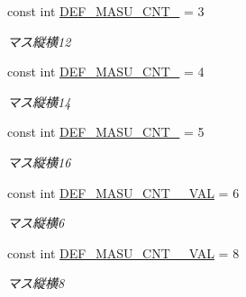 \begin{DoxyCompactItemize}
const int \hyperlink{class_reversi_form_1_1_reversi_const_aeb3bc389d85d1018293b65d93b585c87}{D\+E\+F\+\_\+\+M\+A\+S\+U\+\_\+\+C\+N\+T\+\_} = 3
\begin{DoxyCompactList}\small\item\em マス縦横12 \end{DoxyCompactList}\item 
\mbox{\label{class_reversi_form_1_1_reversi_const_abcbffb3e5165e8aab750b6b27ba08f86}} 
const int \hyperlink{class_reversi_form_1_1_reversi_const_abcbffb3e5165e8aab750b6b27ba08f86}{D\+E\+F\+\_\+\+M\+A\+S\+U\+\_\+\+C\+N\+T\+\_} = 4
\begin{DoxyCompactList}\small\item\em マス縦横14 \end{DoxyCompactList}\item 
\mbox{\label{class_reversi_form_1_1_reversi_const_a6e546a464ee9e35eb3ead02c41e9bd1f}} 
const int \hyperlink{class_reversi_form_1_1_reversi_const_a6e546a464ee9e35eb3ead02c41e9bd1f}{D\+E\+F\+\_\+\+M\+A\+S\+U\+\_\+\+C\+N\+T\+\_} = 5
\begin{DoxyCompactList}\small\item\em マス縦横16 \end{DoxyCompactList}\item 
\mbox{\label{class_reversi_form_1_1_reversi_const_a277a6661b72c88141678b1d2ac12948c}} 
const int \hyperlink{class_reversi_form_1_1_reversi_const_a277a6661b72c88141678b1d2ac12948c}{D\+E\+F\+\_\+\+M\+A\+S\+U\+\_\+\+C\+N\+T\+\_\+\_\+\+V\+AL} = 6
\begin{DoxyCompactList}\small\item\em マス縦横6 \end{DoxyCompactList}\item 
\mbox{\label{class_reversi_form_1_1_reversi_const_a9c1eff92f5330aeca5790ead2b3c36eb}} 
const int \hyperlink{class_reversi_form_1_1_reversi_const_a9c1eff92f5330aeca5790ead2b3c36eb}{D\+E\+F\+\_\+\+M\+A\+S\+U\+\_\+\+C\+N\+T\+\_\+\_\+\+V\+AL} = 8
\begin{DoxyCompactList}\small\item\em マス縦横8 \end{DoxyCompactList}\item 

\end{DoxyCompactItemize}
